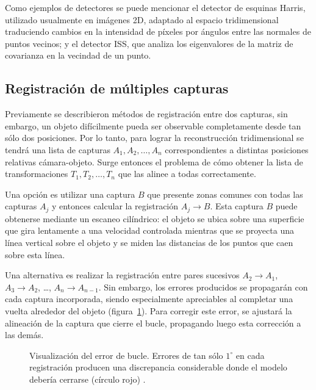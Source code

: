 Como ejemplos de detectores se puede mencionar el detector de esquinas Harris,
utilizado usualmente en imágenes 2D, adaptado al espacio tridimensional
traduciendo cambios en la intensidad de píxeles por ángulos entre las normales de puntos vecinos;
y el detector ISS, que analiza los eigenvalores de la matriz de covarianza en la vecindad de un punto.


\subsection{Registración de múltiples capturas}
Previamente se describieron métodos de registración entre dos capturas,
sin embargo, un objeto difícilmente pueda ser observable completamente desde tan sólo dos posiciones.
Por lo tanto, para lograr la reconstrucción tridimensional se tendrá una lista de capturas
${A_1, A_2, \ldots, A_n}$ correspondientes a distintas posiciones relativas cámara-objeto.
Surge entonces el problema de cómo obtener la lista de transformaciones ${T_1, T_2, \ldots, T_n}$
que las alinee a todas correctamente.

Una opción es utilizar una captura $B$ que presente zonas comunes con todas las capturas $A_j$
y entonces calcular la registración $A_j \to B$.
Esta captura $B$ puede obtenerse mediante un escaneo cilíndrico: el objeto se
ubica sobre una superficie que gira lentamente a una velocidad controlada
mientras que se proyecta una línea vertical sobre el objeto y se miden las
distancias de los puntos que caen sobre esta línea.

Una alternativa es realizar la registración entre pares sucesivos
$A_2 \to A_1$,
$A_3 \to A_2$,
\ldots,
$A_{n} \to A_{n-1}$.
Sin embargo, los errores producidos se propagarán con cada
captura incorporada, siendo especialmente apreciables al completar una
vuelta alrededor del objeto (figura~\ref{fig:error_bucle}).
Para corregir este error, se ajustará la alineación de la captura que cierre el bucle,
propagando luego esta corrección a las demás.


	\begin{figure}
		\caption[Visualización del error de bucle]{\label{fig:error_bucle}Visualización del error de bucle. Errores de tan sólo $1^{\circ}$
		en cada registración producen una discrepancia considerable
		donde el modelo debería cerrarse (círculo rojo) .}
	\end{figure}
